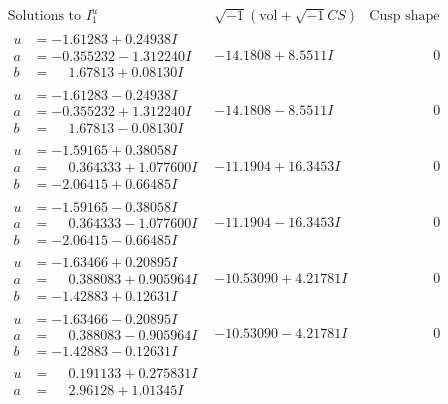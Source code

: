 \documentclass[1p]{elsarticle_modified}
\theoremstyle{definition}
\newcommand{\I}{\sqrt{-1}}
\begin{document}
$$\begin{array}{c|c|c}
\text{Solutions to }I^u_{1}& \I (\text{vol} + \sqrt{-1}CS) & \text{Cusp shape}\\
 \hline 
\begin{aligned}
u &= -1.61283 + 0.24938 I \\
a &= -0.355232 - 1.312240 I \\
b &= \phantom{-}1.67813 + 0.08130 I\end{aligned}
 & -14.1808 + 8.5511 I & \phantom{-0.000000 } 0 \\ \hline\begin{aligned}
u &= -1.61283 - 0.24938 I \\
a &= -0.355232 + 1.312240 I \\
b &= \phantom{-}1.67813 - 0.08130 I\end{aligned}
 & -14.1808 - 8.5511 I & \phantom{-0.000000 } 0 \\ \hline\begin{aligned}
u &= -1.59165 + 0.38058 I \\
a &= \phantom{-}0.364333 + 1.077600 I \\
b &= -2.06415 + 0.66485 I\end{aligned}
 & -11.1904 + 16.3453 I & \phantom{-0.000000 } 0 \\ \hline\begin{aligned}
u &= -1.59165 - 0.38058 I \\
a &= \phantom{-}0.364333 - 1.077600 I \\
b &= -2.06415 - 0.66485 I\end{aligned}
 & -11.1904 - 16.3453 I & \phantom{-0.000000 } 0 \\ \hline\begin{aligned}
u &= -1.63466 + 0.20895 I \\
a &= \phantom{-}0.388083 + 0.905964 I \\
b &= -1.42883 + 0.12631 I\end{aligned}
 & -10.53090 + 4.21781 I & \phantom{-0.000000 } 0 \\ \hline\begin{aligned}
u &= -1.63466 - 0.20895 I \\
a &= \phantom{-}0.388083 - 0.905964 I \\
b &= -1.42883 - 0.12631 I\end{aligned}
 & -10.53090 - 4.21781 I & \phantom{-0.000000 } 0 \\ \hline\begin{aligned}
u &= \phantom{-}0.191133 + 0.275831 I \\
a &= \phantom{-}2.96128 + 1.01345 I \\

\end{aligned}
\end{array}$$
\end{document}
